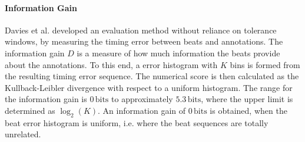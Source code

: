 \documentclass{scrartcl}
\begin{document}
\paragraph{Information Gain}
Davies et al. \cite{Davies2009b} developed an evaluation method without reliance on tolerance windows, by measuring the timing error between beats and annotations. The information gain $D$ is a measure of how much information the beats provide about the annotations. To this end, a error histogram with $K$ bins is formed from the resulting timing error sequence. The numerical score is then calculated as the Kullback-Leibler divergence with respect to a uniform histogram. The range for the information gain is $0\,\text{bits}$ to approximately $5.3\,\text{bits}$, where the upper limit is determined as $\log_2(K)$. An information gain of $0\,\text{bits}$ is obtained, when the beat error histogram is uniform, i.e. where the beat sequences are totally unrelated.
\end{document}

